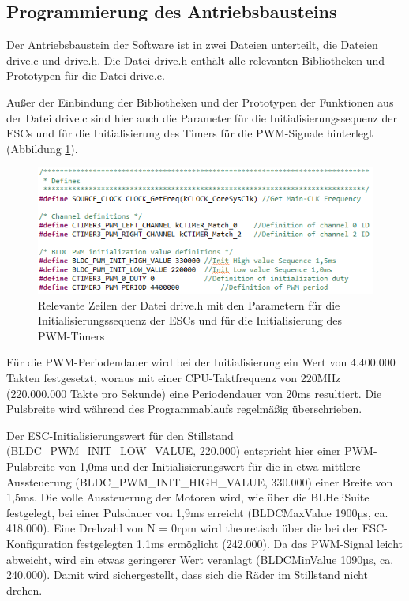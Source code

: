 \subsection{Programmierung des Antriebsbausteins}\label{Sec4Sub4}

Der Antriebsbaustein der Software ist in zwei Dateien unterteilt, die Dateien \glqq{}drive.c\grqq{} und \glqq{}drive.h\grqq{}. Die Datei \glqq{}drive.h\grqq{} enthält alle relevanten Bibliotheken und Prototypen für die Datei \glqq{}drive.c\grqq{}.\vspace{11pt}

Außer der Einbindung der Bibliotheken und der Prototypen der Funktionen aus der Datei \glqq{}drive.c\grqq{} sind hier auch die Parameter für die Initialisierungssequenz der \ac{ESC}s und für die Initialisierung des Timers für die \ac{PWM}-Signale hinterlegt (Abbildung \ref{fig:DriveH}). 

\begin{figure}[H] %
\includegraphics[width=.85\textwidth]{sec4/images/DriveH} 
\centering
\captionsetup{width=.95\textwidth}
\caption[Relevante Zeilen der Datei \glqq{}drive.h\grqq{}]{Relevante Zeilen der Datei \glqq{}drive.h\grqq{} mit den Parametern für die Initialisierungssequenz der \ac{ESC}s und für die Initialisierung des \ac{PWM}-Timers}\centering
\label{fig:DriveH}
\end{figure}

Für die \ac{PWM}-Periodendauer wird bei der Initialisierung ein Wert von 4.400.000 Takten festgesetzt, woraus mit einer \ac{CPU}-Taktfrequenz von 220MHz (220.000.000 Takte pro Sekunde) eine Periodendauer von 20ms resultiert. Die Pulsbreite wird während des Programmablaufs regelmäßig überschrieben.\vspace{11pt}

Der \ac{ESC}-Initialisierungswert für den Stillstand (\glqq{}BLDC\_PWM\_INIT\_LOW\_VALUE\grqq{}, 220.000) entspricht hier einer \ac{PWM}-Pulsbreite von 1,0ms und der Initialisierungswert für die in etwa mittlere Aussteuerung (\glqq{}BLDC\_PWM\_INIT\_HIGH\_VALUE\grqq{}, 330.000) einer Breite von 1,5ms. Die volle Aussteuerung der Motoren wird, wie über die \glqq{}BLHeliSuite\grqq{} festgelegt, bei einer Pulsdauer von 1,9ms erreicht (BLDCMaxValue 1900µs, ca. 418.000). Eine Drehzahl von N = 0rpm wird theoretisch über die bei der \ac{ESC}-Konfiguration festgelegten 1,1ms ermöglicht (242.000). Da das \ac{PWM}-Signal leicht abweicht, wird ein etwas geringerer Wert veranlagt (BLDCMinValue 1090µs, ca. 240.000). Damit wird sichergestellt, dass sich die Räder im Stillstand nicht drehen.\vspace{11pt}

